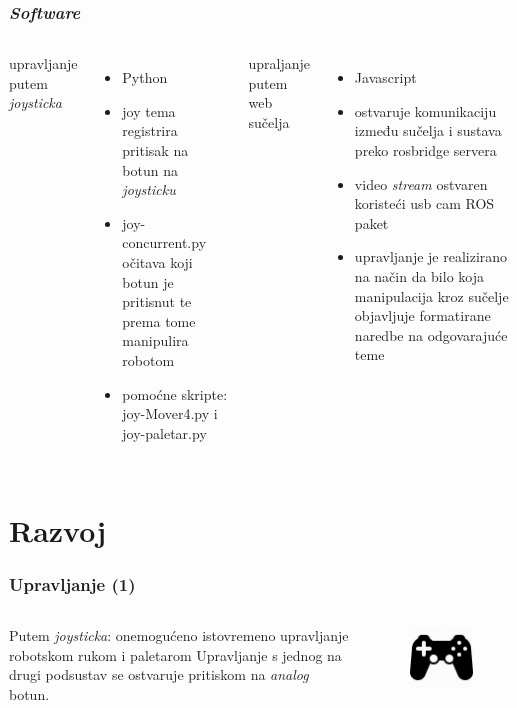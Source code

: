 \documentclass{beamer}
\begin{document}
\begin{frame}
    \frametitle{\emph{Software}}
    \begin{columns}
        upravljanje putem \emph{joysticka}
        \begin{itemize}
                \item Python
                \item joy tema registrira pritisak na botun na \emph{joysticku}
                \item joy-concurrent.py očitava koji botun je pritisnut te prema tome manipulira robotom
                \item pomoćne skripte: joy-Mover4.py i joy-paletar.py
        \end{itemize}

        upraljanje putem web sučelja
        \begin{itemize}
            \item Javascript
            \item ostvaruje komunikaciju između sučelja i sustava preko rosbridge servera
            \item video \emph{stream} ostvaren koristeći usb cam ROS paket
            \item upravljanje je realizirano na način da bilo koja manipulacija kroz sučelje objavljuje formatirane naredbe na odgovarajuće teme
        \end{itemize}

    \end{columns}
\end{frame}

\section{Razvoj}

\begin{frame}
    \frametitle{Upravljanje (1)}
    \begin{columns}
        Putem \emph{joysticka}:
        \newline onemogućeno istovremeno upravljanje robotskom rukom i paletarom
        \newline\newline Upravljanje s jednog na drugi podsustav se ostvaruje pritiskom na \emph{analog} botun.
        \begin{figure}[h!]
            \centering
            \includegraphics[width=50mm]{joy.png}
        \end{figure}
    \end{columns}
\end{frame}
\end{document}
